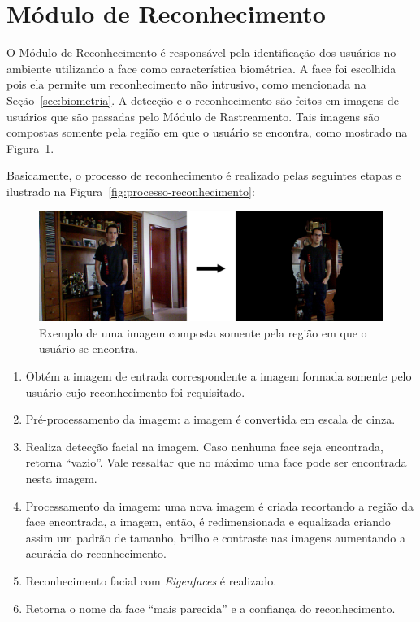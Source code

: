 \section{Módulo de Reconhecimento}

	O Módulo de Reconhecimento é responsável pela identificação dos usuários no ambiente utilizando a face como característica biométrica. A face foi escolhida pois ela permite um reconhecimento não intrusivo, como mencionada na Seção~\ref{sec:biometria}. A detecção e o reconhecimento são feitos em imagens de usuários que são passadas pelo Módulo de Rastreamento. Tais imagens são compostas somente pela região em que o usuário se encontra, como mostrado na Figura~\ref{fig:users-img}.

	Basicamente, o processo de reconhecimento é realizado pelas seguintes etapas e ilustrado na Figura~\ref{fig:processo-reconhecimento}:

		\begin{figure}[hbt]
			\begin{center}
				\includegraphics[scale=0.3]{figuras/4.ProblemaEProposta/users-img.png}
			\end{center}
			\caption{Exemplo de uma imagem composta somente pela região em que o usuário se encontra.}
			\label{fig:users-img}
		\end{figure}

		\begin{enumerate}
			\item Obtém a imagem de entrada correspondente a imagem formada somente pelo usuário cujo reconhecimento foi requisitado.
			\item Pré-processamento da imagem: a imagem é convertida em escala de cinza.
			\item Realiza detecção facial na imagem. Caso nenhuma face seja encontrada, retorna ``vazio''. Vale ressaltar que no máximo uma face pode ser encontrada nesta imagem.
			\item Processamento da imagem: uma nova imagem é criada recortando a região da face encontrada, a imagem, então, é redimensionada e equalizada criando assim um padrão de tamanho, brilho e contraste nas imagens aumentando a acurácia do reconhecimento.
			\item Reconhecimento facial com \textit{Eigenfaces} é realizado.
			\item Retorna o nome da face ``mais parecida'' e a confiança do reconhecimento.
		\end{enumerate}

